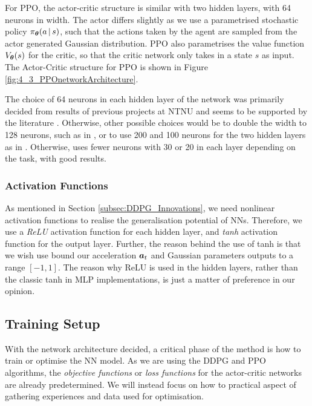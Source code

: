For PPO, the actor-critic structure is similar with two hidden layers, with 64 neurons in width. The actor differs slightly as we use a parametrised stochastic policy $\pi_{\boldsymbol{\theta}} (a \, | \, s)$, such that the actions taken by the agent are sampled from the actor generated Gaussian distribution.
PPO also parametrises the value function $V_{\boldsymbol{\theta}} (s)$ for the critic, so that the critic network only takes in a state $s$ as input. 
The Actor-Critic structure for PPO is shown in Figure \ref{fig:4_3_PPOnetworkArchitecture}.

The choice of 64 neurons in each hidden layer of the network was primarily decided from results of previous projects at NTNU and seems to be supported by the literature \cite{ControlofQuadrotorRL, PPOQuadrotor, PPO}. Otherwise, other possible choices would be to double the width to 128 neurons, such as in \cite{song2021droneRacing}, or to use 200 and 100 neurons for the two hidden layers as in \cite{DDPG, RodriguezRamos2019ADR}. Otherwise, \cite{TRPO} uses fewer neurons with 30 or 20 in each layer depending on the task, with good results.

\subsubsection{Activation Functions}
As mentioned in Section \ref{subsec:DDPG_Innovations}, we need nonlinear activation functions to realise the generalisation potential of NNs. Therefore, we use a \textit{ReLU} activation function for each hidden layer, and \textit{tanh} activation function for the output layer. Further, the reason behind the use of tanh is that we wish use bound our acceleration ${\boldsymbol{a}}_t$ and Gaussian parameters outputs to a range $[-1,1]$. The reason why ReLU is used in the hidden layers, rather than the classic tanh in MLP implementations, is just a matter of preference in our opinion. 


\subsection{Training Setup}
\label{sec:4_5_trainingSetup}

With the network architecture decided, a critical phase of the method is how to train or optimise the NN model. As we are using the DDPG and PPO algorithms, the \textit{objective functions} or \textit{loss functions} for the actor-critic networks are already predetermined. We will instead focus on how to practical aspect of gathering experiences and data used for optimisation.

